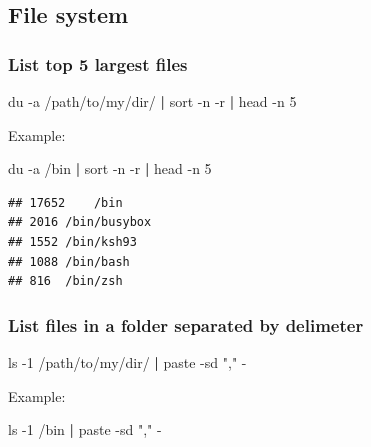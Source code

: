 \documentclass[]{book}
\newenvironment{Shaded}{\begin{snugshade}}{\end{snugshade}}
\newcommand{\ExtensionTok}[1]{#1}
\newcommand{\FunctionTok}[1]{\textcolor[rgb]{0.00,0.00,0.00}{#1}}
\newcommand{\KeywordTok}[1]{\textcolor[rgb]{0.13,0.29,0.53}{\textbf{#1}}}
\newcommand{\NormalTok}[1]{#1}
\newcommand{\StringTok}[1]{\textcolor[rgb]{0.31,0.60,0.02}{#1}}
\begin{document}
\hypertarget{file-system}{%
\subsection{File system}\label{file-system}}

\hypertarget{list-top-5-largest-files}{%
\subsubsection{List top 5 largest files}\label{list-top-5-largest-files}}

\begin{Shaded}
\begin{Highlighting}[]
\FunctionTok{du}\NormalTok{ -a /path/to/my/dir/ }\KeywordTok{|} \FunctionTok{sort}\NormalTok{ -n -r }\KeywordTok{|} \FunctionTok{head}\NormalTok{ -n 5}
\end{Highlighting}
\end{Shaded}

Example:

\begin{Shaded}
\begin{Highlighting}[]
\FunctionTok{du}\NormalTok{ -a /bin }\KeywordTok{|} \FunctionTok{sort}\NormalTok{ -n -r }\KeywordTok{|} \FunctionTok{head}\NormalTok{ -n 5}
\end{Highlighting}
\end{Shaded}

\begin{verbatim}
## 17652    /bin
## 2016 /bin/busybox
## 1552 /bin/ksh93
## 1088 /bin/bash
## 816  /bin/zsh
\end{verbatim}

\hypertarget{list-files-in-a-folder-separated-by-delimeter}{%
\subsubsection{List files in a folder separated by delimeter}\label{list-files-in-a-folder-separated-by-delimeter}}

\begin{Shaded}
\begin{Highlighting}[]
\FunctionTok{ls}\NormalTok{ -1 /path/to/my/dir/ }\KeywordTok{|} \ExtensionTok{paste}\NormalTok{ -sd }\StringTok{","}\NormalTok{ -}
\end{Highlighting}
\end{Shaded}

Example:

\begin{Shaded}
\begin{Highlighting}[]
\FunctionTok{ls}\NormalTok{ -1 /bin }\KeywordTok{|} \ExtensionTok{paste}\NormalTok{ -sd }\StringTok{","}\NormalTok{ -}
\end{Highlighting}
\end{Shaded}
\end{document}

